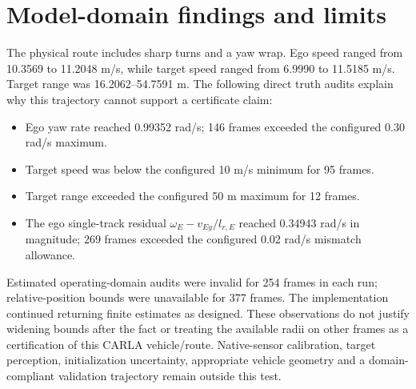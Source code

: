 \documentclass[11pt]{article}
\begin{document}
\section{Model-domain findings and limits}
The physical route includes sharp turns and a yaw wrap. Ego speed ranged
from 10.3569 to 11.2048 m/s, while target speed ranged from 6.9990 to
11.5185 m/s. Target range was 16.2062--54.7591 m. The following direct
truth audits explain why this trajectory cannot support a certificate claim:
\begin{itemize}
\item Ego yaw rate reached 0.99352 rad/s; 146 frames exceeded the configured
0.30 rad/s maximum.
\item Target speed was below the configured 10 m/s minimum for 95 frames.
\item Target range exceeded the configured 50 m maximum for 12 frames.
\item The ego single-track residual
$\omega_E-v_{Ey}/l_{r,E}$ reached 0.34943 rad/s in magnitude;
269 frames exceeded the configured 0.02 rad/s mismatch allowance.
\end{itemize}
Estimated operating-domain audits were invalid for 254 frames in each run;
relative-position bounds were unavailable for 377 frames. The implementation
continued returning finite estimates as designed. These observations do not
justify widening bounds after the fact or treating the available radii on
other frames as a certification of this CARLA vehicle/route. Native-sensor
calibration, target perception, initialization uncertainty, appropriate vehicle
geometry and a domain-compliant validation trajectory remain outside this test.
\end{document}
